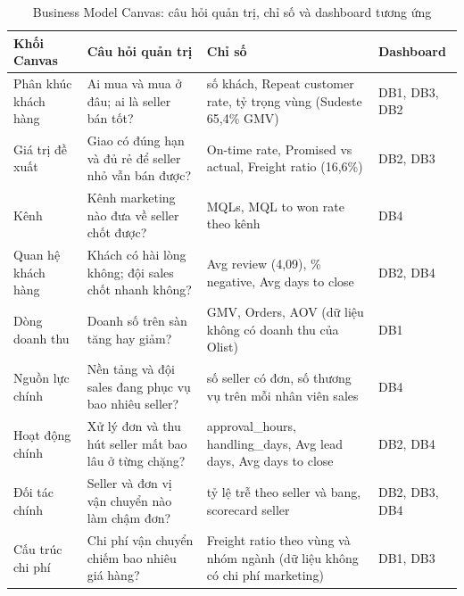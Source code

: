\begin{table}[htbp]\centering\scriptsize\caption{Business Model Canvas: câu hỏi quản trị, chỉ số và dashboard tương ứng}\label{tab:bmc-cau-hoi}
\begin{tabular}{p{2.66cm}p{4.08cm}p{5.32cm}p{1.95cm}}\toprule
\textbf{Khối Canvas} & \textbf{Câu hỏi quản trị} & \textbf{Chỉ số} & \textbf{Dashboard}\\\midrule
Phân khúc khách hàng & Ai mua và mua ở đâu; ai là seller bán tốt? & số khách, Repeat customer rate, tỷ trọng vùng (Sudeste 65,4\% GMV) & DB1, DB3, DB2\\
Giá trị đề xuất & Giao có đúng hạn và đủ rẻ để seller nhỏ vẫn bán được? & On-time rate, Promised vs actual, Freight ratio (16,6\%) & DB2, DB3\\
Kênh & Kênh marketing nào đưa về seller chốt được? & MQLs, MQL to won rate theo kênh & DB4\\
Quan hệ khách hàng & Khách có hài lòng không; đội sales chốt nhanh không? & Avg review (4,09), \% negative, Avg days to close & DB2, DB4\\
Dòng doanh thu & Doanh số trên sàn tăng hay giảm? & GMV, Orders, AOV (dữ liệu không có doanh thu của Olist) & DB1\\
Nguồn lực chính & Nền tảng và đội sales đang phục vụ bao nhiêu seller? & số seller có đơn, số thương vụ trên mỗi nhân viên sales & DB4\\
Hoạt động chính & Xử lý đơn và thu hút seller mất bao lâu ở từng chặng? & approval\_hours, handling\_days, Avg lead days, Avg days to close & DB2, DB4\\
Đối tác chính & Seller và đơn vị vận chuyển nào làm chậm đơn? & tỷ lệ trễ theo seller và bang, scorecard seller & DB2, DB3, DB4\\
Cấu trúc chi phí & Chi phí vận chuyển chiếm bao nhiêu giá hàng? & Freight ratio theo vùng và nhóm ngành (dữ liệu không có chi phí marketing) & DB1, DB3\\
\bottomrule\end{tabular}\end{table}
